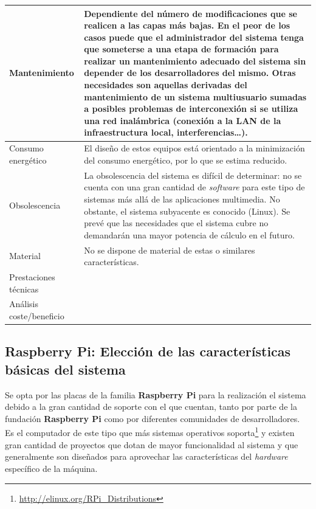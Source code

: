 \begin{table}
\begin{tabular}{|p{2.3cm}|p{11cm}|}
\hline
Mantenimiento&Dependiente del número de modificaciones que se realicen a las capas más bajas. En el peor de los casos puede que el administrador del sistema tenga que someterse a una etapa de formación para realizar un mantenimiento adecuado del sistema sin depender de los desarrolladores del mismo.
 Otras necesidades son aquellas derivadas del mantenimiento de un sistema multiusuario sumadas a posibles problemas de interconexión si se utiliza una red inalámbrica (conexión a la LAN de la infraestructura local, interferencias\dots).\\
\hline
Consumo energético&El diseño de estos equipos está orientado a la minimización del consumo energético, por lo que se estima reducido.\\
\hline
Obsolescencia&La obsolescencia del sistema es difícil de determinar: no se cuenta con una gran cantidad de \textit{software} para este tipo de sistemas más allá de las aplicaciones multimedia. No obstante, el sistema subyacente es conocido (Linux).
Se prevé que las necesidades que el sistema cubre no demandarán una mayor potencia de cálculo en el futuro.\\
\hline
Material&No se dispone de material de estas o similares características.\\
\hline
Prestaciones técnicas&\\
\hline
Análisis coste/beneficio&\\
\hline
\end{tabular}
\end{table}


\subsection{Raspberry Pi: Elección de las características básicas del sistema}

Se opta por las placas de la familia \textbf{Raspberry Pi} para la realización el sistema debido a la gran cantidad de soporte con el que cuentan, tanto por parte de la fundación \textbf{Raspberry Pi} como por diferentes comunidades de desarrolladores. Es el computador de este tipo que más sistemas operativos soporta\footnote{\href{http://elinux.org/RPi_Distributions}{http://elinux.org/RPi\_Distributions}} y existen gran cantidad de proyectos que dotan de mayor funcionalidad al sistema y que generalmente son diseñados para aprovechar las características del \textit{hardware} específico de la máquina.

